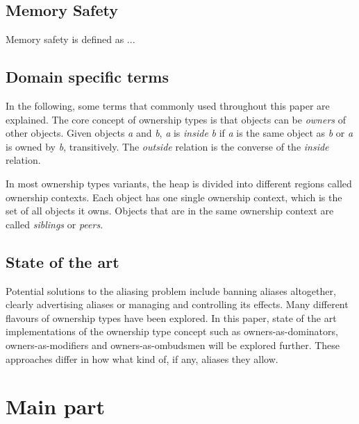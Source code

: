 \documentclass[sigplan,11pt,nonacm]{acmart}
\begin{document}
\subsection{Memory Safety}


Memory safety is defined as ...

\subsection{Domain specific terms}

In the following, some terms that commonly used throughout this paper are explained.
The core concept of ownership types is that objects can be \emph{owners} of other objects.
Given objects \emph{a} and \emph{b}, \emph{a} is \emph{inside} \emph{b} if \emph{a} is the same object as \emph{b} or \emph{a} is owned by \emph{b}, transitively.
The \emph{outside} relation is the converse of the \emph{inside} relation.

In most ownership types variants, the heap is divided into different regions called ownership contexts.
Each object has one single ownership context, which is the set of all objects it owns.
Objects that are in the same ownership context are called \emph{siblings} or \emph{peers}.
\cite{ownership-types-survey}

\subsection{State of the art}



Potential solutions to the aliasing problem include banning aliases altogether, clearly advertising aliases or managing and controlling its effects\cite{ownership-types-survey}.
Many different flavours of ownership types have been explored.
In this paper, state of the art implementations of the ownership type concept such as owners-as-dominators, owners-as-modifiers and owners-as-ombudsmen will be explored further.
These approaches differ in how what kind of, if any, aliases they allow.
\cite{ownership-types-survey}


\section{Main part}
\label{sec:mainpart}
\end{document}

